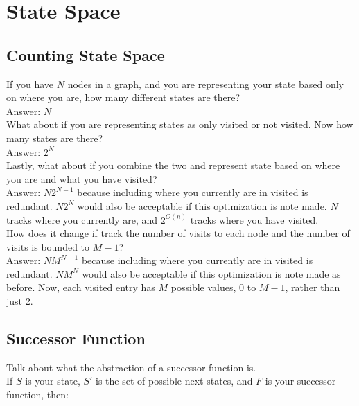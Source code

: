 \documentclass[letterpaper]{article} %
\begin{document}
\section{State Space}

\subsection{Counting State Space}

If you have $N$ nodes in a graph, and you are representing your state based only on where you are, how many different states are there?\\

\noindent
Answer: $N$\\

\noindent
What about if you are representing states as only visited or not visited. Now how many states are there?\\

\noindent
Answer: $2^N$\\

\noindent
Lastly, what about if you combine the two and represent state based on where you are and what you have visited?\\

\noindent
Answer: $N2^{N - 1}$  because including where you currently are in visited is redundant. $N2^{N}$ would also be acceptable if this optimization is note made. $N$ tracks where you currently are, and $2^{O(n)}$ tracks where you have visited.\\

\noindent
How does it change if track the number of visits to each node and the number of visits is bounded to $M - 1$?\\

\noindent
Answer: $NM^{N - 1}$  because including where you currently are in visited is redundant. $NM^{N}$ would also be acceptable if this optimization is note made as before. Now, each visited entry has $M$ possible values, $0$ to $M - 1$, rather than just 2.

\subsection{Successor Function}

Talk about what the abstraction of a successor function is.\\

\noindent
If $S$ is your state, $S'$ is the set of possible next states, and $F$ is your successor function, then:\\
\end{document}
